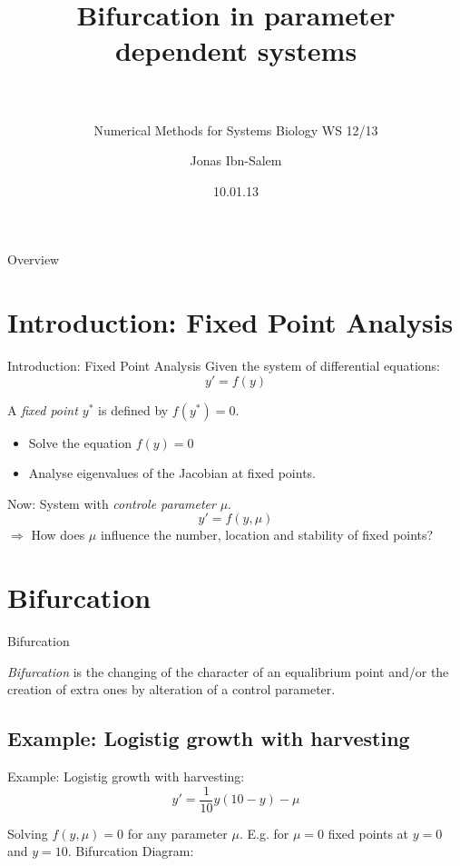 \documentclass{beamer}
\title[Bifurcation]{Bifurcation in parameter dependent systems\\~\\}
\subtitle{Numerical Methods for Systems Biology WS 12/13}
\author[Jonas Ibn-Salem]{Jonas Ibn-Salem}
\institute[]{}
\date{10.01.13}
\begin{document}
\maketitle


\begin{frame}{Overview}
    \tableofcontents
\end{frame}

\section{Introduction: Fixed Point Analysis}
\begin{frame}{Introduction: Fixed Point Analysis}
    Given the system of differential equations:
    $$y' = f(y) $$
    \begin{definition}
        A \emph{fixed point $y^*$} is defined by $f(y^*)=0$.
    \end{definition}
    \begin{itemize}
        \item Solve the equation $f(y) = 0$ 
        \item Analyse eigenvalues of the Jacobian at fixed points.
    \end{itemize}
    Now: System with \emph{controle parameter} $\mu$. 
    $$y' = f(y, \mu)$${}    
    $\Rightarrow$ How does $\mu$ influence the number, location and stability of fixed points?
\end{frame}
\section{Bifurcation}

\begin{frame}{Bifurcation}
    \begin{definition}
        \emph{Bifurcation} is the changing of the character of an equalibrium point and/or the creation of extra ones by alteration of a control parameter.
    \end{definition}

\subsection{Example: Logistig growth with harvesting}

    Example: Logistig growth with harvesting: \\
    $$y' = \frac{1}{10}y(10 - y) - \mu $$

    Solving $f(y,\mu) = 0$ for any parameter $\mu$. 
    E.g. for $\mu = 0$ fixed points at $y=0$ and $y=10$.
    Bifurcation Diagram:
    
    
\end{frame}
\end{document}

